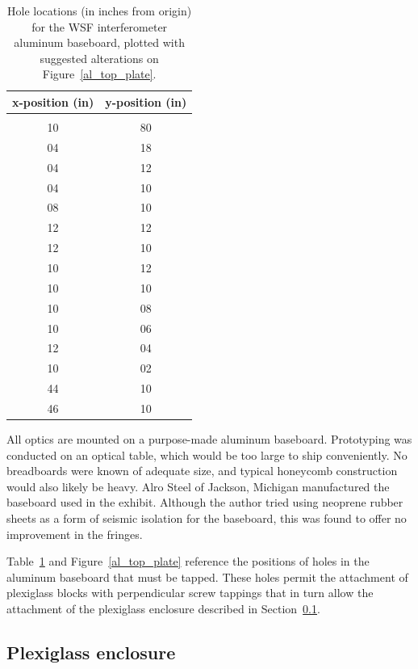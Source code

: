 

\begin{table}[t]
\begin{center}
\begin{tabular}{ c c }
x-position (in) & y-position (in) \\
\hline \\
10 & 80\\
04 & 18\\
04 & 12\\
04 & 10\\
08 & 10\\
12 & 12\\
12 & 10\\
10 & 12\\
10 & 10\\
10 & 08\\
10 & 06\\
12 & 04\\
10 & 02\\
44 & 10\\
46 & 10 \\
\hline
\end{tabular}
\caption{Hole locations (in inches from origin) for the WSF interferometer aluminum baseboard, plotted with suggested alterations on Figure~\ref{al_top_plate}.}
\label{aluminum_baseboard_hole_locations}
\end{center}
\end{table}

All optics are mounted on a purpose-made aluminum baseboard.
Prototyping was conducted on an optical table, which would be too large to ship conveniently.
No breadboards were known of adequate size, and typical honeycomb construction would also likely be heavy.
Alro Steel of Jackson, Michigan manufactured the baseboard used in the exhibit.
Although the author tried using neoprene rubber sheets as a form of seismic isolation for the baseboard, this was found to offer no improvement in the fringes.

Table~\ref{aluminum_baseboard_hole_locations} and Figure~\ref{al_top_plate} reference the positions of holes in the aluminum baseboard that must be tapped. These holes permit the attachment of plexiglass blocks with perpendicular screw tappings that in turn allow the attachment of the plexiglass enclosure described in Section~\ref{enclosure}.

        \subsection{Plexiglass enclosure}
        \label{enclosure}

